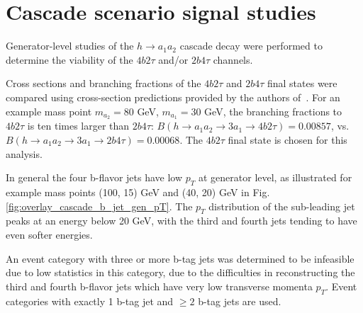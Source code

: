 \section{Cascade scenario signal studies}
\label{section:a1a2_gen_studies}
Generator-level studies of the $h\rightarrow a_1 a_2$ cascade decay were performed to determine the viability of the $4b2\tau$ and/or $2b4\tau$ channels. 

Cross sections and branching fractions of the $4b2\tau$ and $2b4\tau$ final states were compared using cross-section predictions provided by the authors of~\cite{Robens:2019kga}. For an example mass point $m_{a_2} = 80$ GeV, $m_{a_1} = 30$ GeV, the branching fractions to $4b2\tau$ is ten times larger than $2b4\tau$: $B(h \rightarrow a_1 a_2 \rightarrow 3 a_1 \rightarrow 4b2\tau) = 0.00857$, vs. $B(h \rightarrow a_1 a_2 \rightarrow 3 a_1 \rightarrow 2b4\tau) = 0.00068$. The $4b2\tau$ final state is chosen for this analysis.

In general the four b-flavor jets have low $p_{T}$ at generator level, as illustrated for example mass points (100, 15) GeV and (40, 20) GeV in Fig. \ref{fig:overlay_cascade_b_jet_gen_pT}. The $p_{T}$ distribution of the sub-leading jet peaks at an energy below 20 GeV, with the third and fourth jets tending to have even softer energies.

An event category with three or more b-tag jets was determined to be infeasible due to low statistics in this category, due to the difficulties in reconstructing the third and fourth b-flavor jets which have very low transverse momenta $p_{T}$. Event categories with exactly 1 b-tag jet and $\geq 2$ b-tag jets are used.

